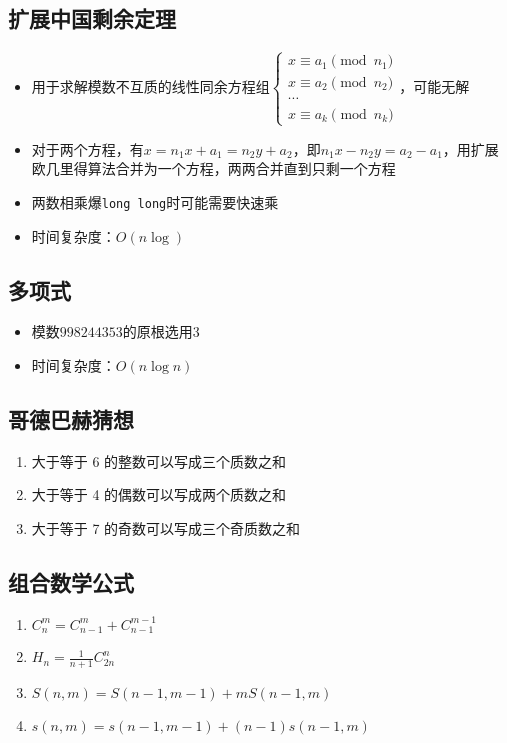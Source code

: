 \documentclass[twocolumn,a4,8pt]{article}  %
\begin{document}
	 	\subsection{扩展中国剩余定理}
	 		\noindent\begin{itemize}
	 			\item 用于求解模数不互质的线性同余方程组$\begin{cases}x\equiv a_1\pmod{n_1}\\x\equiv a_2\pmod{n_2}\\\cdots\\x\equiv a_k\pmod{n_k}\end{cases}$，可能无解
	 			\item 对于两个方程，有$x=n_1x+a_1=n_2y+a_2$，即$n_1x-n_2y=a_2-a_1$，用扩展欧几里得算法合并为一个方程，两两合并直到只剩一个方程
	 			\item 两数相乘爆\texttt{long long}时可能需要快速乘
		 		\item 时间复杂度：$O(n\log)$
	 		\end{itemize}
	 	 	
	 	 	
	 	\subsection{多项式}
	 		\noindent\begin{itemize}
	 			\item 模数$998244353$的原根选用$3$
		 		\item 时间复杂度：$O(n\log n)$
	 		\end{itemize}
	 	 	
	 	 	
	 	\subsection{哥德巴赫猜想}
			\noindent\begin{enumerate}
				\item 大于等于 6 的整数可以写成三个质数之和
				\item 大于等于 4 的偶数可以写成两个质数之和
				\item 大于等于 7 的奇数可以写成三个奇质数之和
			\end{enumerate}

		\subsection{组合数学公式}
			\noindent\begin{enumerate}
				\item $C_{n}^{m}=C_{n-1}^{m}+C_{n-1}^{m-1}$
				\item $H_n=\frac{1}{n+1}C_{2n}^{n}$
				\item $S(n,m)=S(n-1,m-1)+mS(n-1,m)$
				\item $s(n,m)=s(n-1,m-1)+(n-1)s(n-1,m)$
			\end{enumerate}
\end{document}
